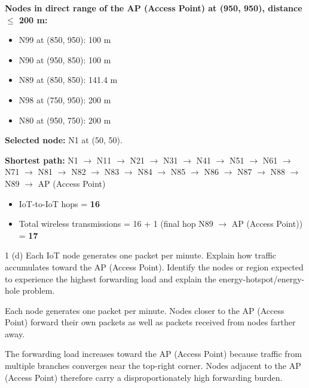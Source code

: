 \textbf{Nodes in direct range of the AP (Access Point) at (950, 950), distance $\leq$ 200 m:}
\begin{itemize}
\item N99 at (850, 950): 100 m
\item N90 at (950, 850): 100 m
\item N89 at (850, 850): 141.4 m
\item N98 at (750, 950): 200 m
\item N80 at (950, 750): 200 m
\end{itemize}

\textbf{Selected node:} N1 at (50, 50).

\textbf{Shortest path:} N1 $\rightarrow$ N11 $\rightarrow$ N21 $\rightarrow$ N31 $\rightarrow$ N41 $\rightarrow$ N51
$\rightarrow$ N61 $\rightarrow$ N71 $\rightarrow$ N81 $\rightarrow$ N82 $\rightarrow$ N83 $\rightarrow$ N84
$\rightarrow$ N85 $\rightarrow$ N86 $\rightarrow$ N87 $\rightarrow$ N88 $\rightarrow$ N89 $\rightarrow$ AP (Access
Point)

\begin{itemize}
\item IoT-to-IoT hops = \textbf{16}
\item Total wireless transmissions = 16 + 1 (final hop N89 $\rightarrow$ AP (Access Point)) = \textbf{17}
\end{itemize}


\begin{question}{1 (d)}
Each IoT node generates one packet per minute. Explain how traffic accumulates toward the AP
(Access Point). Identify the nodes or region expected to experience the highest forwarding load and explain the
energy-hotspot/energy-hole problem.
\end{question}

Each node generates one packet per minute. Nodes closer to the AP (Access Point) forward their own packets as well as packets
received from nodes farther away.

The forwarding load increases toward the AP (Access Point) because traffic from multiple branches converges near the top-right
corner. Nodes adjacent to the AP (Access Point) therefore carry a disproportionately high forwarding burden.

